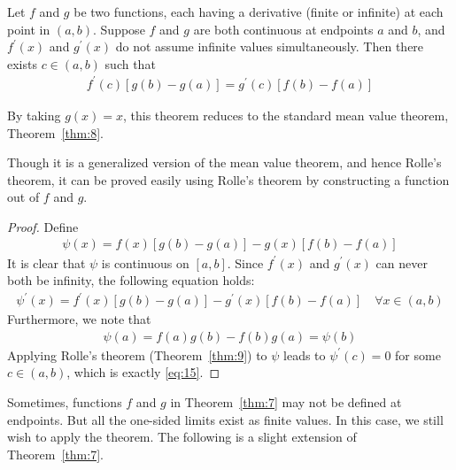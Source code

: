 \documentclass[thmcnt=section, 12pt]{my-elegantbook}
\begin{document}
\begin{theorem} \label{thm:7}
    Let $f$ and $g$ be two functions, each having a derivative (finite or infinite) at each point in $(a, b)$. Suppose $f$ and $g$ are both continuous at endpoints $a$ and $b$, and $f^\prime(x)$ and $g^\prime(x)$ do not assume infinite values simultaneously. Then there exists $c \in (a, b)$ such that 
    \begin{align}
        f^\prime(c) [g(b) - g(a)]
        = g^\prime(c) [f(b) - f(a)]
        \label{eq:15}
    \end{align} 
\end{theorem}

\begin{remark}
    By taking $g(x) = x$, this theorem reduces to the standard mean value theorem, Theorem~\ref{thm:8}.
\end{remark}

\par Though it is a generalized version of the mean value theorem, and hence Rolle's theorem, it can be proved easily using Rolle's theorem by constructing a function out of $f$ and $g$.

\begin{proof}
    Define 
    \begin{align*}
        \psi(x) = f(x)[g(b) - g(a)] - g(x) [f(b) - f(a)]
    \end{align*}
    It is clear that $\psi$ is continuous on $[a, b]$. Since $f^\prime(x)$ and $g^\prime(x)$ can never both be infinity, the following equation holds:
    \begin{align*}
        \psi^\prime(x)
        = f^\prime(x)[g(b) - g(a)] - g^\prime(x) [f(b) - f(a)]
        \quad \forall x \in (a, b)
    \end{align*}
    Furthermore, we note that 
    \begin{align*}
        \psi(a) = f(a)g(b) - f(b)g(a)
        = \psi(b)
    \end{align*}
    Applying Rolle's theorem (Theorem~\ref{thm:9}) to $\psi$ leads to $\psi^\prime(c) = 0$ for some $c \in (a, b)$, which is exactly \eqref{eq:15}.
\end{proof}


\par Sometimes, functions $f$ and $g$ in Theorem~\ref{thm:7} may not be defined at endpoints. But all the one-sided limits exist as finite values. In this case, we still wish to apply the theorem. The following is a slight extension of Theorem~\ref{thm:7}.
\end{document}
